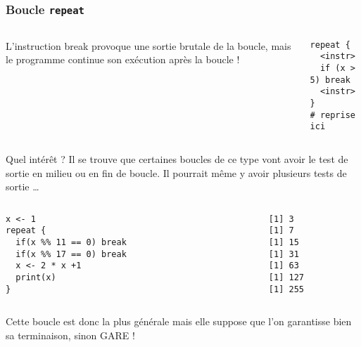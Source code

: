 \documentclass[10pt]{beamer}
\begin{document}
\begin{frame}[fragile]
  \frametitle{Boucle \texttt{repeat}}
\begin{columns}[c]
\begin{column}{0.63\textwidth}
  L'instruction break provoque une sortie brutale de la boucle, mais le programme continue son exécution après la boucle !
\end{column}
\begin{column}{0.33\textwidth}
  \begin{lstlisting}[style=edblock]
repeat {
  <instr>
  if (x > 5) break
  <instr>
}
# reprise ici
\end{lstlisting}
\end{column}
\end{columns}



Quel intérêt ? Il se trouve que certaines boucles de ce type vont avoir le test de sortie en milieu ou en fin de boucle.
Il pourrait même y avoir plusieurs tests de sortie \dots

\begin{columns}[c]
\begin{column}{0.48\textwidth}
\begin{lstlisting}[style=editor]
x <- 1
repeat {
  if(x %% 11 == 0) break
  if(x %% 17 == 0) break
  x <- 2 * x +1
  print(x)
}
\end{lstlisting}

\end{column}
\begin{column}{0.1\textwidth}
  \RUN
\end{column}

\begin{column}{0.28\textwidth}
  \begin{lstlisting}
[1] 3
[1] 7
[1] 15
[1] 31
[1] 63
[1] 127
[1] 255
  \end{lstlisting}
\end{column}
\end{columns}
Cette boucle est donc la plus générale mais elle suppose que l'on garantisse bien sa terminaison, sinon GARE !
\end{frame}

 \questionSlide

 \appendix
 \backupSlides
\end{document}

